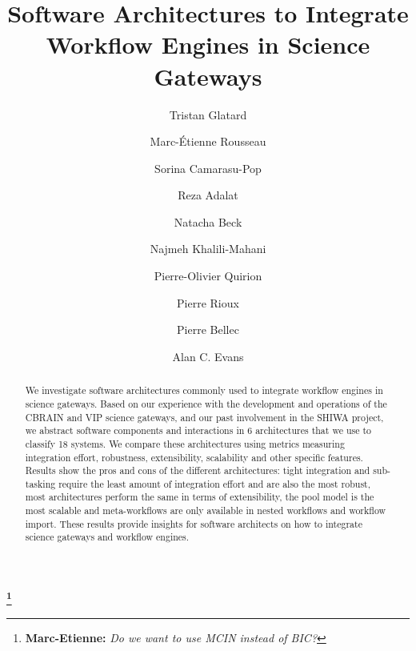 \documentclass[preprint,3p,twocolumn]{elsarticle}
\newcommand{\note}[2]{\textbf{\Large{\color{blue}\footnote{{\color{blue}\textbf{#1:} \textit{#2}\color{black}}}}}}
\begin{document}
\begin{frontmatter}



\title{Software Architectures to Integrate Workflow Engines in Science Gateways}


\author[mcgill,creatis]{Tristan Glatard}
\author[mcgill]{Marc-\'Etienne Rousseau}
\author[creatis]{Sorina Camarasu-Pop}

\author[mcgill]{Reza Adalat}
\author[mcgill]{Natacha Beck}
\author[mcgill]{Najmeh Khalili-Mahani}
\author[criugm]{Pierre-Olivier Quirion}
\author[mcgill]{Pierre Rioux}

\author[criugm]{Pierre Bellec}
\author[mcgill]{Alan C. Evans}

\note{Marc-Etienne}{Do we want to use MCIN instead of BIC?}
\address[mcgill]{McConnell Brain Imaging Centre, Montreal Neurological Institute, McGill University, Canada.}
\address[creatis]{University of Lyon, CNRS, INSERM, CREATIS, Villeurbanne, France.}
\address[criugm]{Centre de Recherche de l'Institut de G\'eriatrie de Montr\'eal CRIUGM, Montreal, QC, Canada.}

\begin{abstract}
  We investigate software architectures commonly used to integrate workflow engines
  in science gateways. Based on our experience with the development
  and operations of the CBRAIN and VIP science gateways, and our past
  involvement in the SHIWA project, we abstract software components
  and interactions in 6 architectures that we use to classify 18
  systems. We compare these architectures using metrics measuring
  integration effort, robustness, extensibility, scalability and other
  specific features. Results show the pros and cons of the different
  architectures: tight integration and sub-tasking require the least
  amount of integration effort and are also the most robust, most
  architectures perform the same in terms of extensibility, the pool
  model is the most scalable and meta-workflows are only available in
  nested workflows and workflow import. These results provide insights
  for software architects on how to integrate science gateways and
  workflow engines.
\end{abstract}


\end{frontmatter}
\end{document}
